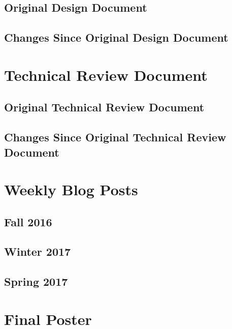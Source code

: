 \documentclass[letterpaper,10pt]{article}
\begin{document}
\subsection{Original Design Document}


\subsection{Changes Since Original Design Document}


\section{Technical Review Document}
\subsection{Original Technical Review Document}


\subsection{Changes Since Original Technical Review Document}


\section{Weekly Blog Posts}
\subsection{Fall 2016}


\subsection{Winter 2017}


\subsection{Spring 2017}


\clearpage
\section{Final Poster}
\clearpage 
\end{document}
